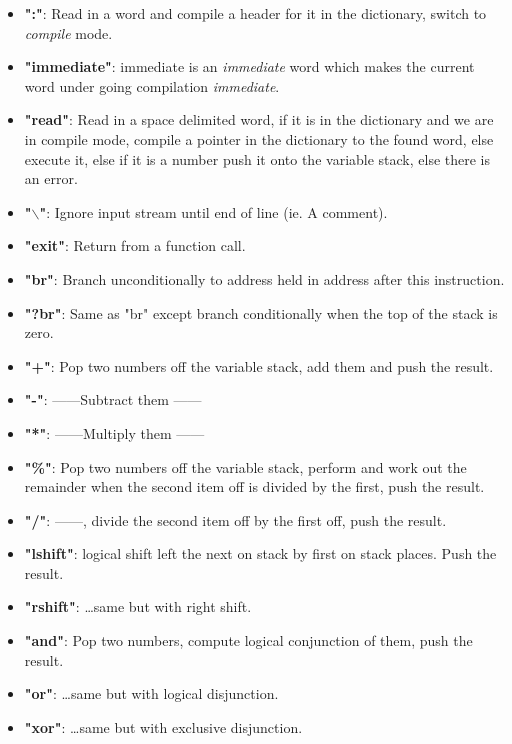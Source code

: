 \documentclass	[a4paper, 10pt]	{article}
\newcommand*{\ditto}{---\textquotedbl---}
\begin{document}
      \begin{itemize}
        \item \textbf{":"}: Read in a word and compile a header for it in the
        dictionary, switch to \emph{compile} mode.
        \item \textbf{"immediate"}: immediate is an \emph{immediate} word which
        makes the current word under going compilation \emph{immediate}.
        \item \textbf{"read"}: Read in a space delimited word, if it is in the
        dictionary and we are in compile mode, compile a pointer in the dictionary
        to the found word, else execute it, else if it is a number push it onto
        the variable stack, else there is an error.
        \item \textbf{"$\backslash$"}: Ignore input stream until end of line 
        (ie. A comment).
        \item \textbf{"exit"}: Return from a function call.
        \item \textbf{"br"}: Branch unconditionally to address held in address
        after this instruction.
        \item \textbf{"?br"}: Same as "br" except branch conditionally when
        the top of the stack is zero.
        \item \textbf{"+"}: Pop two numbers off the variable stack, add them
        and push the result.
        \item \textbf{"-"}: \ditto Subtract them \ditto 
        \item \textbf{"*"}: \ditto Multiply them \ditto
        \item \textbf{"\%"}: Pop two numbers off the variable stack, perform
        and work out the remainder when the second item off is divided by
        the first, push the result.
        \item \textbf{"/"}: \ditto, divide the second item off by the first
        off, push the result.
        \item \textbf{"lshift"}: logical shift left the next on stack by
        first on stack places. Push the result.
        \item \textbf{"rshift"}: \ldots same but with right shift.
        \item \textbf{"and"}: Pop two numbers, compute logical conjunction of them,
        push the result.
        \item \textbf{"or"}: \ldots same but with logical disjunction.
        \item \textbf{"xor"}: \ldots same but with exclusive disjunction.

\end{itemize}
\end{document}
